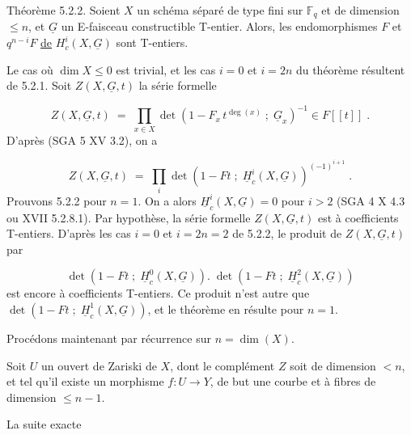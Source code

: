 
Théorème 5.2.2. Soient $X$ un schéma séparé de type fini sur $\mathbb{F}_q$ et de dimension $\leq n$, et $\underline{G}$ un E-faisceau constructible T-entier. Alors, les endomorphismes $F$ et $q^{n-i} F$ \underline{de} $H^i_c (X,\underline{G})$ sont T-entiers.

Le cas où $\dim X \leq 0$ est trivial, et les cas $i = 0$ et $i = 2n$ du théorème résultent de 5.2.1. Soit $Z(X,\underline{G},t)$ la série formelle

\begin{equation*}
Z(X,\underline{G},t) \;=\; \prod_{x \in X} \det (1-F_x \, t^{\deg(x)} \;;\; \underline{G}_x)^{-1} \in F[[t]] \;.
\end{equation*}
D'après (SGA 5 XV 3.2), on a

\begin{equation}\tag{5.2.3}
Z(X,\underline{G},t) \;=\; \prod_i \det (1-Ft \;;\; \underline{H}^i_c(X,\underline{G}))^{(-1)^{i+1}} \;.
\end{equation}
Prouvons 5.2.2 pour $n = 1$. On a alors $\underline{H}^i_c(X,\underline{G}) = 0$ pour $i > 2$ (SGA 4 X 4.3 ou XVII 5.2.8.1). Par hypothèse, la série formelle $Z(X,\underline{G},t)$ est à coefficients T-entiers. D'après les cas $i = 0$ et $i = 2n = 2$ de 5.2.2, le produit de $Z(X,\underline{G},t)$ par

\begin{equation*}
\det(1-Ft \;;\; \underline{H}^0_c(X,\underline{G})). \; \det(1-Ft \;;\; \underline{H}^2_c(X,\underline{G}))
\end{equation*}
est encore à coefficients T-entiers. Ce produit n'est autre que $\det(1-Ft \;;\; \underline{H}^1_c(X,\underline{G}))$, et le théorème en résulte pour $n = 1$.

Procédons maintenant par récurrence sur $n = \dim(X)$.

Soit $U$ un ouvert de Zariski de $X$, dont le complément $Z$ soit de dimension $< n$, et tel qu'il existe un morphisme $f : U \longrightarrow Y$, de but une courbe et à fibres de dimension $\leq n-1$.



\begin{center}
\end{center}
La suite exacte

